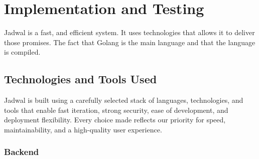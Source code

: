\chapter{Implementation and Testing}

Jadwal is a fast, and efficient system. It uses technologies that allows it to deliver those promises. The fact that Golang is the main language and that the language is compiled.

\section{Technologies and Tools Used}

Jadwal is built using a carefully selected stack of languages, technologies, and tools that enable fast iteration, strong security, ease of development, and deployment flexibility. Every choice made reflects our priority for speed, maintainability, and a high-quality user experience.

\subsection{Backend}

